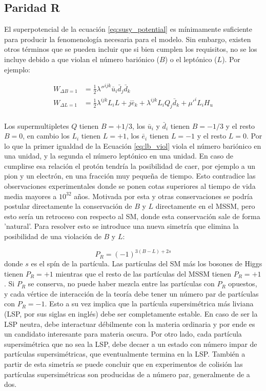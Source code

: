 \subsection{Paridad R}

El superpotencial de la ecuación \ref{eq:susy_potential} es mínimamente suficiente para producir la fenomenología necesaria para el modelo. Sin embargo, existen otros términos que se pueden incluir que si bien cumplen los requisitos, no se los incluye debido a que violan el número bariónico ($B$) o el leptónico ($L$). Por ejemplo:

\begin{equation}
	\begin{split}
		W_{\Delta B = 1} & = \frac{1}{2}\lambda ''^{ijk}\bar{u}_i\bar{d}_j\bar{d}_k \\
		W_{\Delta L = 1} & = \frac{1}{2}\lambda^{ijk}L_iL+j\bar{e}_k + \lambda^{ijk}L_iQ_j\bar{d}_k + \mu '^{i}L_i H_u \\
	\end{split}
	\label{eq:lb_viol}
\end{equation}

Los supermultipletes $Q$ tienen $B=+1/3$, los $\bar{u}_i$ y $\bar{d}_i$ tienen $B=-1/3$ y el resto $B=0$, en cambio los $L_i$ tienen $L=+1$, los $\bar{e}_i$ tienen $L=-1$ y el resto $L=0$. Por lo que la primer igualdad de la Ecuación \ref{eq:lb_viol} viola el número bariónico en una unidad, y la segunda el número leptónico en una unidad. En caso de cumplirse esa relación el protón tendría la posibilidad de caer, por ejemplo a un pion y un electrón, en una fracción muy pequeña de tiempo. Esto contradice las observaciones experimentales donde se ponen cotas superiores al tiempo de vida media mayores a $10^{32}$ años. Motivada por esta y otras conservaciones se podría postular directamente la conservación de $B$ y $L$ directamente en el MSSM, pero esto sería un retroceso con respecto al SM, donde esta conservación sale de forma 'natural'. Para resolver esto se introduce una nueva simetría que elimina la posibilidad de una violación de $B$ y $L$:

\begin{equation}
	P_R = (-1)^{3(B-L)+2s}
\end{equation}
%
donde $s$ es el spín de la partícula. Las partículas del SM más los bosones de Higgs tienen $P_R = +1$ mientras que el resto de las partículas del MSSM tienen $P_R = +1$. Si $P_R$ se conserva, no puede haber mezcla entre las partículas con $P_R$ opuestos, y cada vértice de interacción de la teoría debe tener un número par de partículas con $P_R=-1$. Esto a su vez implica que la partícula supersimétrica más liviana (LSP, por sus siglas en inglés) debe ser completamente estable. En caso de ser la LSP neutra, debe interactuar débilmente con la materia ordinaria y por ende es un candidato interesante para materia oscura. Por otro lado, cada partícula supersimétrica que no sea la LSP, debe decaer a un estado con número impar de partículas supersimétricas, que eventualmente termina en la LSP. También a partir de esta simetría se puede concluir que en experimentos de colisión las partículas supersimétricas son producidas de a número par, generalmente de a dos.



